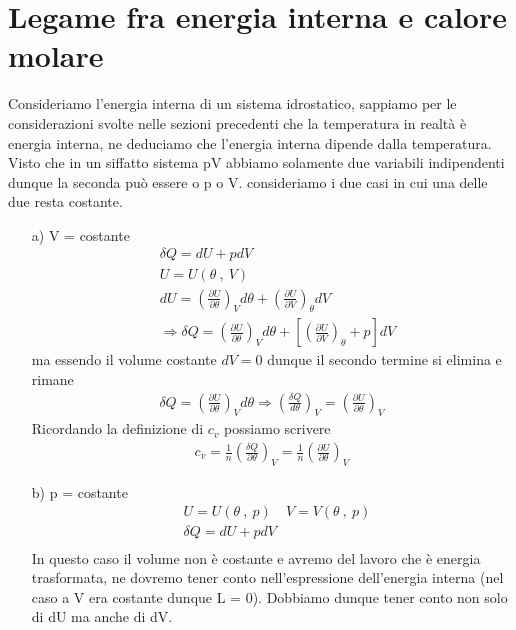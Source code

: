 \documentclass[10pt,a4paper]{article}
\begin{document}
\section{Legame fra energia interna e calore molare}
Consideriamo l'energia interna di un sistema idrostatico, sappiamo per le considerazioni svolte nelle sezioni precedenti che la temperatura in realtà è energia interna, ne deduciamo che l'energia interna dipende dalla temperatura. Visto che in un siffatto sistema pV abbiamo solamente due variabili indipendenti dunque la seconda può essere o p o V. consideriamo i due casi in cui una delle due resta costante.
\begin{itemize}
	\item[a)] V = costante\\
	\begin{align*} 
	&\delta Q = dU + pdV\\
	&U = U(\theta\ ,\ V)\\
	&dU = \left(\frac{\partial U}{\partial \theta}\right)_V d\theta +\left(\frac{\partial U}{\partial V}\right)_{\theta} dV\\
	&\Rightarrow \delta Q = \left(\frac{\partial U}{\partial \theta}\right)_V d\theta +\left[\left(\frac{\partial U}{\partial V}\right)_{\theta}+p\right]dV
	\end{align*} 
	ma essendo il volume costante \(dV = 0\) dunque il secondo termine si elimina e rimane
	\begin{align*} 
	\delta Q = \left(\frac{\partial U}{\partial \theta}\right)_V d\theta \Rightarrow \left(\frac{\delta Q}{d \theta}\right)_V = \left(\frac{\partial U}{\partial \theta}\right)_V
	\end{align*} 
	Ricordando la definizione di \(c_v\) possiamo scrivere
	\begin{align*} 
		c_v = \frac{1}{n} \left( \frac{\delta Q}{\partial \theta}\right)_V = \frac{1}{n} \left(\frac{\partial U}{\partial \theta}\right)_V
	\end{align*} 
	\item[b)] p = costante\\
	\begin{align*} 
		&U = U(\theta\ ,\ p) \quad V = V(\theta\ ,\ p)\\
		&\delta Q = dU + pdV\\
	\end{align*} 
	In questo caso il volume non è costante e avremo del lavoro che è energia trasformata, ne dovremo tener conto nell'espressione dell'energia interna (nel caso a V era costante dunque L = 0). Dobbiamo dunque tener conto non solo di dU ma anche di dV.

\end{itemize}
\end{document}
